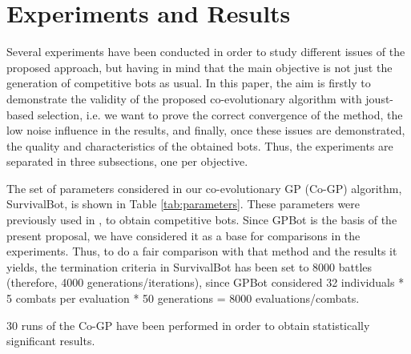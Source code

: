 \documentclass[conference]{IEEEtran}
\begin{document}


%
\section{Experiments and Results}
\label{sec:experiments}

Several experiments have been conducted in order to study different issues of the proposed approach, but having in mind that the main objective is not just the generation of competitive bots as usual. In this paper, the aim is firstly to demonstrate the validity of the proposed co-evolutionary algorithm with joust-based selection, i.e. we want to prove the correct convergence of the method, the low noise influence in the results, and finally, once these issues are demonstrated, the quality and characteristics of the obtained bots.
Thus, the experiments are separated in three subsections, one per objective.

The set of parameters considered in our co-evolutionary GP (Co-GP) algorithm, SurvivalBot, is shown in Table \ref{tab:parameters}.
These parameters were previously used in \cite{GarciaGP14}, to obtain competitive bots. Since GPBot is the basis of the present proposal, we have considered it as a base for comparisons in the experiments.
Thus, to do a fair comparison with that method and the results it yields, the termination criteria in SurvivalBot has been set to 8000 battles (therefore, 4000 generations/iterations), since GPBot considered 32 individuals * 5 combats per evaluation * 50 generations = 8000 evaluations/combats. 

30 runs of the Co-GP have been performed in order to obtain statistically significant results. %

\end{document}

